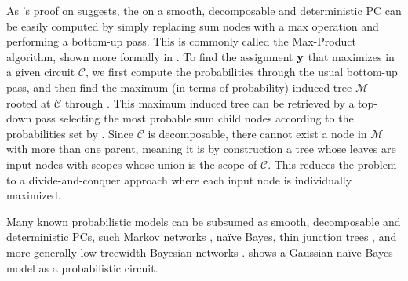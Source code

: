 As 's proof on  suggests, the \map{} on a smooth, decomposable
and deterministic PC can be easily computed by simply replacing sum nodes with a max operation and
performing a bottom-up \evi{} pass. This is commonly called the Max-Product algorithm, shown more
formally in . To find the assignment $\mathbf{y}$ that maximizes  in a
given circuit $\mathcal{C}$, we first compute the \map{} probabilities through the usual bottom-up
pass, and then find the maximum (in terms of probability) induced tree $\mathcal{M}$ rooted at
$\mathcal{C}$ through . This maximum induced tree can be retrieved by a top-down
pass selecting the most probable sum child nodes according to the probabilities set by \map{}.
Since $\mathcal{C}$ is decomposable, there cannot exist a node in $\mathcal{M}$ with more than one
parent, meaning it is by construction a tree whose leaves are input nodes with scopes whose union
is the scope of $\mathcal{C}$. This reduces the problem to a divide-and-conquer approach where each
input node is individually maximized.

Many known probabilistic models can be subsumed as smooth, decomposable and deterministic PCs, such
Markov networks \citep{lowd13a}, naïve Bayes, thin junction trees \citep{bach01}, and more
generally low-treewidth Bayesian networks \citep{darwiche03}.  shows a Gaussian
naïve Bayes model as a probabilistic circuit.

